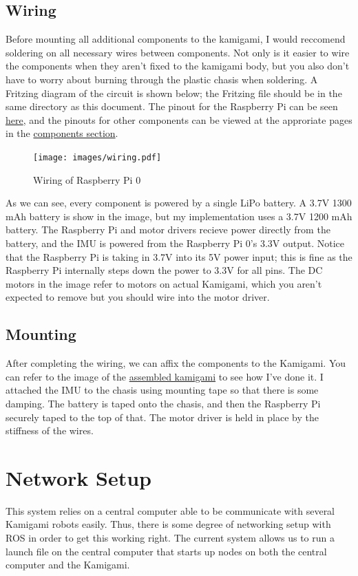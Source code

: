 \documentclass[11pt]{article}
\begin{document}
\subsection{Wiring}

Before mounting all additional components to the kamigami, I would reccomend soldering on all necessary wires between components. Not only is it easier to wire the components when they aren't fixed to the kamigami body, but you also don't have to worry about burning through the plastic chasis when soldering. A Fritzing diagram of the circuit is shown below; the Fritzing file should be in the same directory as this document.
The pinout for the Raspberry Pi can be seen \href{https://pinout.xyz}{here},
and the pinouts for other components can be viewed at the approriate pages in the \hyperref[sec:components]{components section}.

\begin{figure}[h]
    \centering
    \texttt{[image: images/wiring.pdf]}
    \caption{Wiring of Raspberry Pi 0}
    \label{fig:wiring}
\end{figure}

As we can see, every component is powered by a single LiPo battery. A 3.7V 1300 mAh battery is show in the image, but my implementation uses a 3.7V 1200 mAh battery. The Raspberry Pi and motor drivers recieve power directly from the battery, and the IMU is powered from the Raspberry Pi 0's 3.3V output. Notice that the Raspberry Pi is taking in 3.7V into its 5V power input; this is fine as the Raspberry Pi internally steps down the power to 3.3V for all pins. The DC motors in the image refer to motors on actual Kamigami, which you aren't expected to remove but you should wire into the motor driver.

\subsection{Mounting}
After completing the wiring, we can affix the components to the Kamigami. You can refer to the image of the \hyperref[fig:kamigami]{assembled kamigami} to see how I've done it. 
I attached the IMU to the chasis using mounting tape so that there is some damping. The battery is taped onto the chasis, and then the Raspberry Pi securely taped to the top of that. The motor driver is held in place by the stiffness of the wires.

\section{Network Setup}
This system relies on a central computer able to be communicate with several Kamigami robots easily. Thus, there is some degree of networking setup with ROS in order to get this working right. The current system allows us to run a launch file on the central computer that starts up nodes on both the central computer and the Kamigami.
\end{document}
